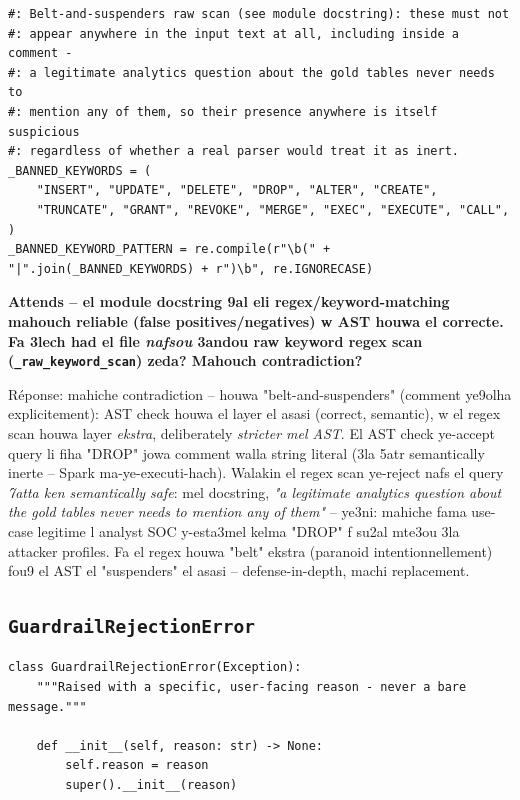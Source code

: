\documentclass[11pt,a4paper]{report}
\DeclareRobustCommand{\code}[1]{\texttt{#1}}
\begin{document}
\begin{lstlisting}[style=pystyle]
#: Belt-and-suspenders raw scan (see module docstring): these must not
#: appear anywhere in the input text at all, including inside a comment -
#: a legitimate analytics question about the gold tables never needs to
#: mention any of them, so their presence anywhere is itself suspicious
#: regardless of whether a real parser would treat it as inert.
_BANNED_KEYWORDS = (
    "INSERT", "UPDATE", "DELETE", "DROP", "ALTER", "CREATE",
    "TRUNCATE", "GRANT", "REVOKE", "MERGE", "EXEC", "EXECUTE", "CALL",
)
_BANNED_KEYWORD_PATTERN = re.compile(r"\b(" + "|".join(_BANNED_KEYWORDS) + r")\b", re.IGNORECASE)
\end{lstlisting}

\begin{soual}
\textbf{Attends -- el module docstring 9al eli regex/keyword-matching
mahouch reliable (false positives/negatives) w AST houwa el correcte.
Fa 3lech had el file \emph{nafsou} 3andou raw keyword regex scan
(\code{\_raw\_keyword\_scan}) zeda? Mahouch contradiction?}

Réponse: mahiche contradiction -- houwa "belt-and-suspenders" (comment
ye9olha explicitement): AST check houwa el layer el asasi (correct,
semantic), w el regex scan houwa layer \emph{ekstra}, deliberately
\emph{stricter mel AST}. El AST check ye-accept query li fiha "DROP"
jowa comment walla string literal (3la 5atr semantically inerte -- Spark
ma-ye-executi-hach). Walakin el regex scan ye-reject nafs el query
\emph{7atta ken semantically safe}: mel docstring, \emph{"a legitimate
analytics question about the gold tables never needs to mention any of
them"} -- ye3ni: mahiche fama use-case legitime l analyst SOC y-esta3mel
kelma "DROP" f su2al mte3ou 3la attacker profiles. Fa el regex houwa
"belt" ekstra (paranoid intentionnellement) fou9 el AST el "suspenders"
el asasi -- defense-in-depth, machi replacement.
\end{soual}

\subsection{\code{GuardrailRejectionError}}

\begin{lstlisting}[style=pystyle]
class GuardrailRejectionError(Exception):
    """Raised with a specific, user-facing reason - never a bare message."""

    def __init__(self, reason: str) -> None:
        self.reason = reason
        super().__init__(reason)
\end{lstlisting}
\end{document}
